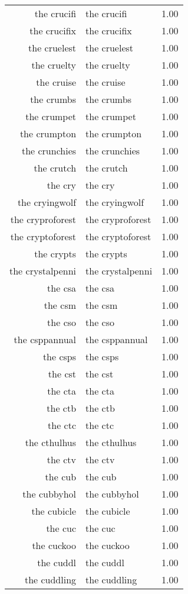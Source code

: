 \begin{table}[ht]
\begin{tabular}{rlr}
  the crucifi & the crucifi & 1.00 \\ 
  the crucifix & the crucifix & 1.00 \\ 
  the cruelest & the cruelest & 1.00 \\ 
  the cruelty & the cruelty & 1.00 \\ 
  the cruise & the cruise & 1.00 \\ 
  the crumbs & the crumbs & 1.00 \\ 
  the crumpet & the crumpet & 1.00 \\ 
  the crumpton & the crumpton & 1.00 \\ 
  the crunchies & the crunchies & 1.00 \\ 
  the crutch & the crutch & 1.00 \\ 
  the cry & the cry & 1.00 \\ 
  the cryingwolf & the cryingwolf & 1.00 \\ 
  the cryproforest & the cryproforest & 1.00 \\ 
  the cryptoforest & the cryptoforest & 1.00 \\ 
  the crypts & the crypts & 1.00 \\ 
  the crystalpenni & the crystalpenni & 1.00 \\ 
  the csa & the csa & 1.00 \\ 
  the csm & the csm & 1.00 \\ 
  the cso & the cso & 1.00 \\ 
  the csppannual & the csppannual & 1.00 \\ 
  the csps & the csps & 1.00 \\ 
  the cst & the cst & 1.00 \\ 
  the cta & the cta & 1.00 \\ 
  the ctb & the ctb & 1.00 \\ 
  the ctc & the ctc & 1.00 \\ 
  the cthulhus & the cthulhus & 1.00 \\ 
  the ctv & the ctv & 1.00 \\ 
  the cub & the cub & 1.00 \\ 
  the cubbyhol & the cubbyhol & 1.00 \\ 
  the cubicle & the cubicle & 1.00 \\ 
  the cuc & the cuc & 1.00 \\ 
  the cuckoo & the cuckoo & 1.00 \\ 
  the cuddl & the cuddl & 1.00 \\ 
  the cuddling & the cuddling & 1.00 \\ 

\end{tabular}
\end{table}
